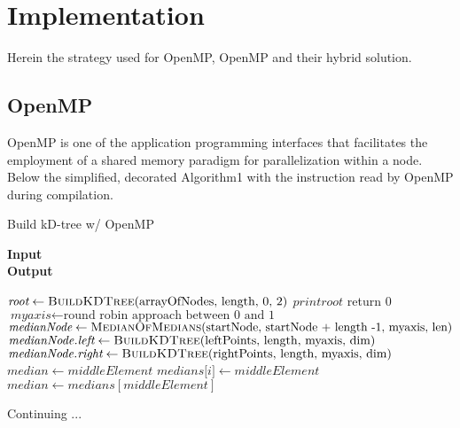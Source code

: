 \documentclass[11pt]{article}
\begin{document}
\section{Implementation}

Herein the strategy used for OpenMP, OpenMP and their hybrid solution.

\subsection{OpenMP}
OpenMP is one of the application programming interfaces that facilitates the employment of a shared memory paradigm for parallelization within a node.
Below the simplified, decorated Algorithm1 with the instruction read by OpenMP during compilation.
\begin{algorithm}[H]
\caption{Build kD-tree w/ OpenMP}
\hspace*{\algorithmicindent} \textbf{Input}  \\
\hspace*{\algorithmicindent} \textbf{Output} 
\begin{algorithmic}[1]
\color{blue}
\color{black}
\State $\textit{root} \gets \Call{BuildKDTree}{$arrayOfNodes, length, 0, 2$}$
\color{blue}
\color{black}
\State $print \textit{root}$
\EndFunction
{}
\Statex
{}
\State return 0
\EndIf
\Statex
\State $\textit{myaxis} \gets \text{round robin approach between 0 and 1}$
\Statex
\State $\textit{medianNode} \gets \Call{MedianOfMedians}{$startNode, startNode + length -1, myaxis, len$}$
\Statex
\color{blue}
\color{black}
\State $\textit{medianNode.left} \gets \Call{BuildKDTree}{$leftPoints, length, myaxis, dim$}$
\color{blue}
\color{black}
\State $\textit{medianNode.right} \gets \Call{BuildKDTree}{$rightPoints, length, myaxis, dim$}$
\State \Return {}
\EndFunction
\Statex
{}
\State {}
\State $\textit{median} \gets middleElement$
\Else
{}
\color{blue}
\color{black}
\State {}
\State $\textit{medians[i]} \gets middleElement$
\EndFor
\Statex
\State {}
\State $\textit{median} \gets medians[middleElement]$
\EndIf
\State \Return {}
\EndFunction
\Statex
{}
\end{algorithmic}
\end{algorithm}
Continuing ... 
\begin{algorithm}[h]
\begin{algorithmic}[1]
\State {}
\EndProcedure
\end{algorithmic}
\end{algorithm}
\end{document}
